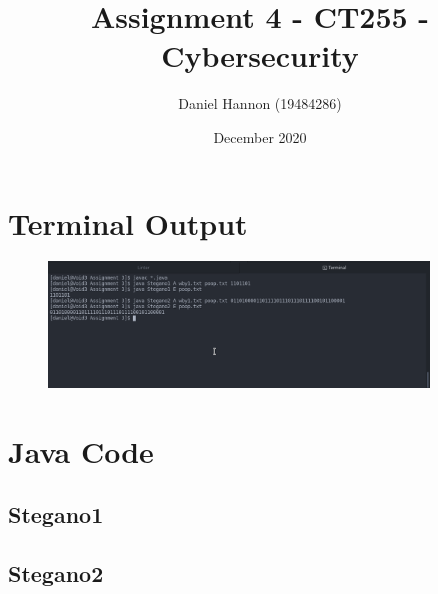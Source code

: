 \documentclass{article}
\title{Assignment 4 - CT255 - Cybersecurity}
\author{Daniel Hannon (19484286)}
\date{December 2020}
\begin{document}
	\maketitle
	\section{Terminal Output}
	\begin{figure}[h!]
		\centering
		\includegraphics[width=0.9\textwidth]{poop.png}
	\end{figure}
	\section{Java Code}
	\subsection{Stegano1}
	\subsection{Stegano2}
	
	
\end{document}
